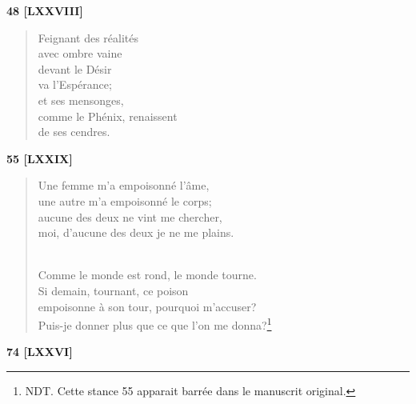 \documentclass[a4paper,12pt]{book}
\begin{document}
\begin{center} {\bf 48 [LXXVIII]} \end{center}

\begin{verse}
Feignant des réalités \\
avec ombre vaine \\
devant le Désir \\
va l'Espérance; \\
et ses mensonges, \\
comme le Phénix, renaissent \\
de ses cendres. \\
\end{verse}

\bigskip

\begin{center} {\bf 55 [LXXIX]} \end{center}

\begin{verse}
Une femme m'a empoisonné l'âme, \\
une autre m'a empoisonné le corps; \\
aucune des deux ne vint me chercher, \\
moi, d'aucune des deux je ne me plains. \\ \

Comme le monde est rond, le monde tourne. \\
Si demain, tournant, ce poison \\
empoisonne à son tour, pourquoi m'accuser? \\
Puis-je donner plus que ce que l'on me donna?\footnote{NDT. Cette stance 55 apparait barrée dans le manuscrit original.} \\
\end{verse}

\bigskip

\begin{center} {\bf 74 [LXXVI]} \end{center}
\end{document}
